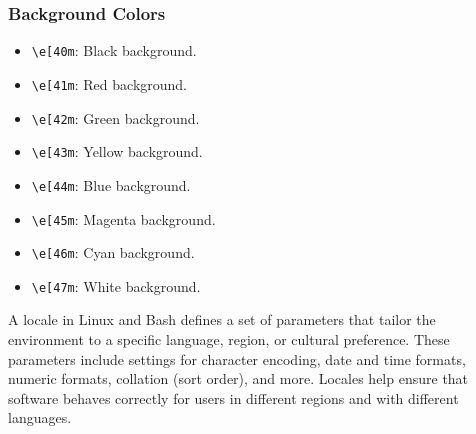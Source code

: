 \documentclass{report}
\begin{document}
\subsubsection{Background Colors}
\begin{itemize}
    \item \texttt{\textbackslash e[40m}: Black background.
    \item \texttt{\textbackslash e[41m}: Red background.
    \item \texttt{\textbackslash e[42m}: Green background.
    \item \texttt{\textbackslash e[43m}: Yellow background.
    \item \texttt{\textbackslash e[44m}: Blue background.
    \item \texttt{\textbackslash e[45m}: Magenta background.
    \item \texttt{\textbackslash e[46m}: Cyan background.
    \item \texttt{\textbackslash e[47m}: White background.
\end{itemize}

\pagebreak 
{} 
\bigbreak \noindent 
\begin{concept}
    A locale in Linux and Bash defines a set of parameters that tailor the environment to a specific language, region, or cultural preference. These parameters include settings for character encoding, date and time formats, numeric formats, collation (sort order), and more. Locales help ensure that software behaves correctly for users in different regions and with different languages.
\end{concept}
\bigbreak \noindent 
\end{document}
